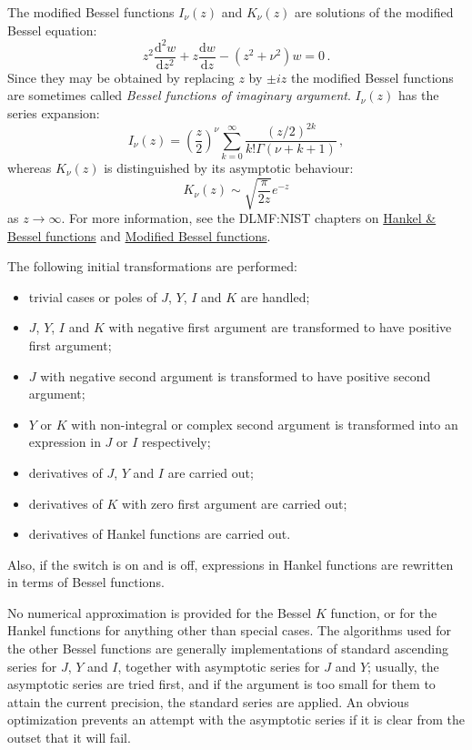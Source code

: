 The modified Bessel functions $I_\nu(z)$ and $K_\nu(z)$ are solutions of the
modified Bessel equation:
$$z^2\frac{\mathrm{d}^2w}{\mathrm{d}z^2}+z\frac{\mathrm{d}w}{\mathrm{d}z} -
(z^2 + \nu^2)w = 0\,.$$
Since they may be obtained by replacing $z$ by $\pm i z$ the modified Bessel
functions are sometimes called \emph{Bessel functions  of imaginary argument}.
$I_\nu(z)$ has the series expansion:
$$I_\nu(z) = \left(\frac{z}{2}\right)^\nu \sum_{k=0}^\infty \frac{(z/2)^{2k}}{k!\Gamma(\nu+k+1)}\,,$$
whereas $K_\nu(z)$ is distinguished by its asymptotic behaviour:
$$K_\nu(z) \sim \sqrt{\frac{\pi}{2 z}}e^{-z}$$
as $z\rightarrow \infty$. For more information, see the DLMF:NIST chapters on
\href{https://dlmf.nist.gov/10.2}{Hankel \& Bessel functions} and \href{https://dlmf.nist.gov/10.25}{Modified Bessel functions}.


The following initial transformations are performed:

\begin{itemize}
\item trivial cases or poles of $J$, $Y$, $I$ and $K$ are handled;
\item $J$, $Y$, $I$ and $K$ with negative first argument are transformed to have
positive first argument;
\item $J$ with negative second argument is transformed to have positive second
argument;
\item $Y$ or $K$ with non-integral or complex second argument is transformed
into an expression in $J$ or $I$ respectively;
\item derivatives of $J$, $Y$ and $I$ are carried out;
\item derivatives of $K$ with zero first argument are carried out;
\item derivatives of Hankel functions are carried out.
\end{itemize}
Also, if the  switch is on and  is off,
expressions in Hankel functions are rewritten in terms of Bessel functions.

No numerical approximation is provided for the Bessel $K$ function, or
for the Hankel functions for anything other than special cases.  The
algorithms used for the other Bessel functions are generally
implementations of standard ascending series for $J$, $Y$ and $I$,
together with asymptotic series for $J$ and $Y$; usually, the
asymptotic series are tried first, and if the argument is too small
for them to attain the current precision, the standard series are
applied.  An obvious optimization prevents an attempt with the
asymptotic series if it is clear from the outset that it will fail.

